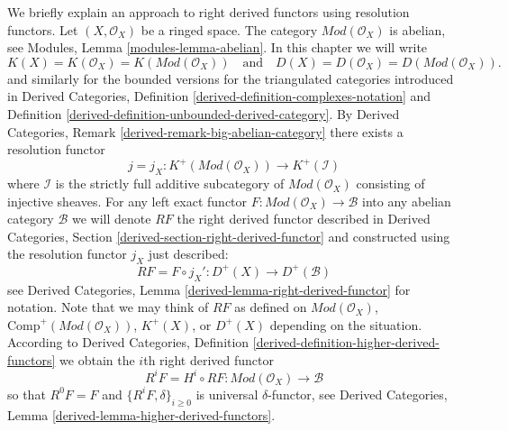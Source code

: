 \noindent
We briefly explain an approach to right derived functors using resolution
functors. Let $(X, \mathcal{O}_X)$ be a ringed space. The category
$\textit{Mod}(\mathcal{O}_X)$ is abelian, see
Modules, Lemma \ref{modules-lemma-abelian}.
In this chapter we will write
$$
K(X) = K(\mathcal{O}_X) = K(\textit{Mod}(\mathcal{O}_X))
\quad
\text{and}
\quad
D(X) = D(\mathcal{O}_X) = D(\textit{Mod}(\mathcal{O}_X)).
$$
and similarly for the bounded versions for the triangulated categories
introduced in
Derived Categories, Definition \ref{derived-definition-complexes-notation} and
Definition \ref{derived-definition-unbounded-derived-category}.
By
Derived Categories, Remark \ref{derived-remark-big-abelian-category}
there exists a resolution functor
$$
j = j_X :
K^{+}(\textit{Mod}(\mathcal{O}_X))
\longrightarrow
K^{+}(\mathcal{I})
$$
where $\mathcal{I}$ is the strictly full additive subcategory of
$\textit{Mod}(\mathcal{O}_X)$ consisting of injective sheaves.
For any left exact functor
$F : \textit{Mod}(\mathcal{O}_X) \to \mathcal{B}$
into any abelian category $\mathcal{B}$ we will denote $RF$ the
right derived functor described in
Derived Categories, Section \ref{derived-section-right-derived-functor}
and constructed using the resolution functor $j_X$ just described:
\begin{equation}
\label{equation-RF}
RF = F \circ j_X' : D^{+}(X) \longrightarrow D^{+}(\mathcal{B})
\end{equation}
see
Derived Categories, Lemma \ref{derived-lemma-right-derived-functor}
for notation. Note that we may think of $RF$ as defined on
$\textit{Mod}(\mathcal{O}_X)$,
$\text{Comp}^{+}(\textit{Mod}(\mathcal{O}_X))$,
$K^{+}(X)$, or $D^{+}(X)$
depending on the situation. According to
Derived Categories, Definition \ref{derived-definition-higher-derived-functors}
we obtain the $i$th right derived functor
\begin{equation}
\label{equation-RFi}
R^iF = H^i \circ RF : \textit{Mod}(\mathcal{O}_X) \longrightarrow \mathcal{B}
\end{equation}
so that $R^0F = F$ and $\{R^iF, \delta\}_{i \geq 0}$ is universal
$\delta$-functor, see
Derived Categories, Lemma \ref{derived-lemma-higher-derived-functors}.

